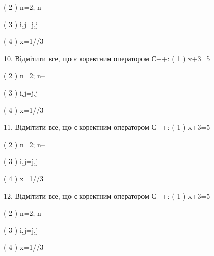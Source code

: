 \documentclass[11pt]{article}
\begin{document}
( 2 ) n=2; n--

( 3 ) i,j=j,j

( 4 ) x=1//3

10. Відмітити все, що є коректним оператором С++:
( 1 ) x+3=5

( 2 ) n=2; n--

( 3 ) i,j=j,j

( 4 ) x=1//3

11. Відмітити все, що є коректним оператором С++:
( 1 ) x+3=5

( 2 ) n=2; n--

( 3 ) i,j=j,j

( 4 ) x=1//3

12. Відмітити все, що є коректним оператором С++:
( 1 ) x+3=5

( 2 ) n=2; n--

( 3 ) i,j=j,j

( 4 ) x=1//3













\newpage
\end{document}
